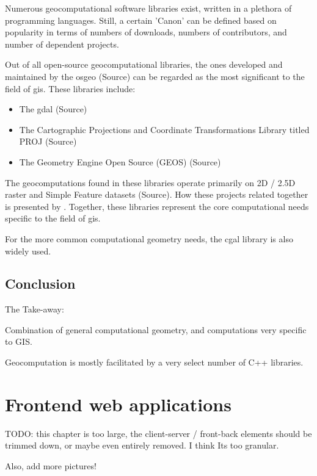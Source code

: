 Numerous geocomputational software libraries exist, written in a plethora of programming languages. 
Still, a certain 'Canon' can be defined based on popularity in terms of numbers of downloads, numbers of contributors, and number of dependent projects.  

Out of all open-source geocomputational libraries, the ones developed and maintained by the \ac{osgeo} (Source) can be regarded as the most significant to the field of \ac{gis}. 
These libraries include:
\begin{itemize}[]
  \item The \ac{gdal} (Source) 
  \item The Cartographic Projections and Coordinate Transformations Library titled PROJ (Source)
  \item The Geometry Engine Open Source (GEOS) (Source)
\end{itemize}
The geocomputations found in these libraries operate primarily on 2D / 2.5D raster and Simple Feature datasets (Source).
How these projects related together is presented by .
Together, these libraries represent the core computational needs specific to the field of \ac{gis}. 

For the more common computational geometry needs, the \ac{cgal} library is also widely used.


\subsection{Conclusion}

The Take-away: 

Combination of general computational geometry, and computations very specific to GIS.

Geocomputation is mostly facilitated by a very select number of C++ libraries. 

\newpage

\section{Frontend web applications}
\label{sec:background-web}

\begin{note}
  TODO: this chapter is too large, the client-server / front-back elements should be trimmed down, or maybe even entirely removed. I think Its too granular. 

  Also, add more pictures!
\end{note}

